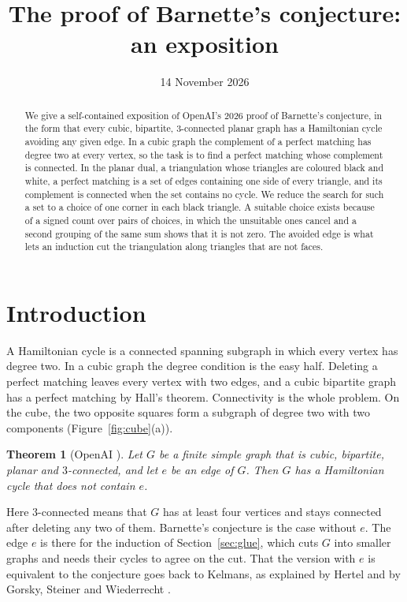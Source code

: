 \documentclass[10pt]{amsart}
\title[Barnette's conjecture]{The proof of Barnette's conjecture: an exposition}
\date{14 November 2026}
\numberwithin{equation}{section}
\newtheorem{theorem}[equation]{Theorem}
\theoremstyle{definition}
\theoremstyle{remark}
\begin{document}
\begin{abstract}
We give a self-contained exposition of OpenAI's 2026 proof of Barnette's conjecture, in the form that every cubic, bipartite, 3-connected planar graph has a Hamiltonian cycle avoiding any given edge.
In a cubic graph the complement of a perfect matching has degree two at every vertex, so the task is to find a perfect matching whose complement is connected.
In the planar dual, a triangulation whose triangles are coloured black and white, a perfect matching is a set of edges containing one side of every triangle, and its complement is connected when the set contains no cycle.
We reduce the search for such a set to a choice of one corner in each black triangle.
A suitable choice exists because of a signed count over pairs of choices, in which the unsuitable ones cancel and a second grouping of the same sum shows that it is not zero.
The avoided edge is what lets an induction cut the triangulation along triangles that are not faces.
\end{abstract}
\maketitle

\section{Introduction}

A Hamiltonian cycle is a connected spanning subgraph in which every vertex has degree two.
In a cubic graph the degree condition is the easy half.
Deleting a perfect matching leaves every vertex with two edges, and a cubic bipartite graph has a perfect matching by Hall's theorem.
Connectivity is the whole problem.
On the cube, the two opposite squares form a subgraph of degree two with two components (Figure~\ref{fig:cube}(a)).

\begin{theorem}[OpenAI {\cite[Theorem~1.1 and Corollary~7.1]{openai2026}}]\label{thm:main}
Let $G$ be a finite simple graph that is cubic, bipartite, planar and $3$-connected, and let $e$ be an edge of $G$.
Then $G$ has a Hamiltonian cycle that does not contain $e$.
\end{theorem}

Here $3$-connected means that $G$ has at least four vertices and stays connected after deleting any two of them.
Barnette's conjecture is the case without $e$.
The edge $e$ is there for the induction of Section~\ref{sec:glue}, which cuts $G$ into smaller graphs and needs their cycles to agree on the cut.
That the version with $e$ is equivalent to the conjecture goes back to Kelmans, as explained by Hertel \cite[Corollary~3]{hertel2005} and by Gorsky, Steiner and Wiederrecht \cite[Theorem~4.3]{gsw2023}.
\end{document}

